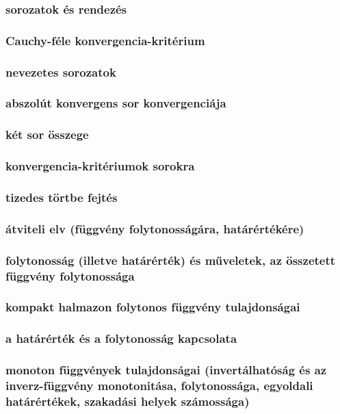 \documentclass[12pt]{article}
\begin{document}
\subsubsection{sorozatok és rendezés}
\subsubsection{Cauchy-féle konvergencia-kritérium}
\subsubsection{nevezetes sorozatok}
\subsubsection{abszolút konvergens sor konvergenciája}
\subsubsection{két sor összege}
\subsubsection{konvergencia-kritériumok sorokra}
\subsubsection{tizedes törtbe fejtés}
\subsubsection{átviteli elv (függvény folytonosságára, határértékére)}
\subsubsection{folytonosság (illetve határérték) és műveletek, az összetett függvény folytonossága}
\subsubsection{kompakt halmazon folytonos függvény tulajdonságai}
\subsubsection{a határérték és a folytonosság kapcsolata}
\subsubsection{monoton függvények tulajdonságai (invertálhatóság és az inverz-függvény monotonitása, folytonossága, egyoldali határértékek, szakadási helyek számossága)}
\end{document}

